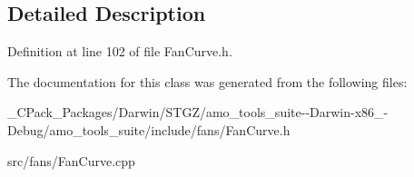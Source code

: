\subsection{Detailed Description}


Definition at line 102 of file Fan\+Curve.\+h.



The documentation for this class was generated from the following files\+:\begin{DoxyCompactItemize}
\item 
\+\_\+\+C\+Pack\+\_\+\+Packages/\+Darwin/\+S\+T\+G\+Z/amo\+\_\+tools\+\_\+suite-\/-\/\+Darwin-\/x86\+\_-\/\+Debug/amo\+\_\+tools\+\_\+suite/include/fans/Fan\+Curve.\+h\item 
src/fans/Fan\+Curve.\+cpp\end{DoxyCompactItemize}
